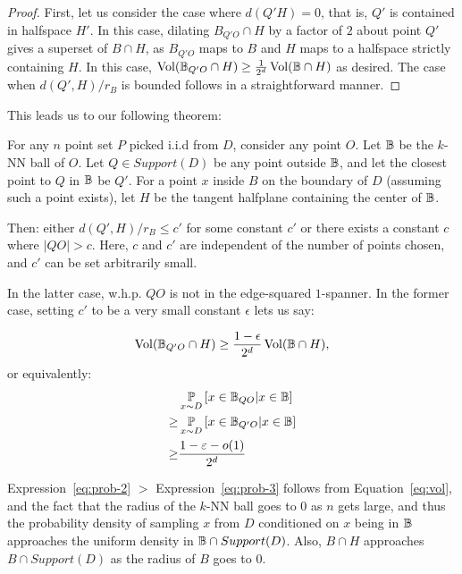 \begin{proof} First, let us consider the case where $d(Q' H) =
0$, that is, $Q'$ is contained in halfspace $H'$.  In this case,
  dilating $B_{Q'O} \cap H$ by a factor of $2$ about point $Q'$
  gives a superset of $B\cap H$, as $B_{Q'O}$ maps to $B$ and $H$
  maps to a halfspace strictly containing $H$. In this case,
  $\operatorname{Vol}(\mathbb{B}_{Q'O} \cap H) \geq \frac{1}{2^d} \operatorname{Vol}(\mathbb{B} \cap H)$ as
  desired.
  The case when
  $d(Q', H)/r_B$ is bounded follows in a straightforward manner.
  \end{proof}


This leads us to our following theorem:
\begin{theorem} For any $n$ point set $P$ picked i.i.d from $D$, consider any
  point $O$. Let $\mathbb{B}$ be the $k$-NN ball of $O$.  
  Let $Q \in Support(D)$ be any point outside 
  $\mathbb{B}$, and let the closest point to $Q$ in $\mathbb{B}$ be $Q'$. For a
  point $x$ inside $B$ on the boundary of $D$ (assuming such a
  point exists), let $H$ be the tangent halfplane containing the
  center of $\mathbb{B}$.

  Then: either $d(Q', H) /
  r_B \leq c'$ for some constant $c'$ or there exists a constant
  $c$ where $|QO| > c$. Here, $c$ and $c'$ are
  independent of the number of points chosen, and $c'$ can be set
  arbitrarily small.

  In the latter case, w.h.p. $QO$ is not in the edge-squared
  $1$-spanner. In the former case, setting $c'$ to be a very
  small constant $\epsilon$ lets us say:

  \begin{align} \label{eq:vol}
    \operatorname{Vol}(\mathbb{B}_{Q'O} \cap H) \geq \frac{1-\epsilon}{2^d} \operatorname{Vol}(\mathbb{B}
    \cap H),
  \end{align}
  or equivalently:
  \begin{align} \label{eq:prob}
    & \operatorname*{\mathbb{P}}_{x\sim D}\left[ x \in \mathbb{B}_{QO} | x \in \mathbb{B} \right]
  \\
    \label{eq:prob-2}
    \geq & \operatorname*{\mathbb{P}}_{x\sim D}\left[ x \in \mathbb{B}_{Q'O} | x \in \mathbb{B} \right]
  \\ \label{eq:prob-3}
    \geq & \frac{1-\varepsilon-o(1)}{2^d}
  \end{align}
\end{theorem}
Expression~\ref{eq:prob-2} $>$ Expression~\ref{eq:prob-3} follows from Equation~\ref{eq:vol}, and
the fact that the radius of the $k$-NN ball goes to $0$ as $n$
gets large, and thus the probability density of sampling $x$ from
$D$ conditioned on $x$ being in $\mathbb{B}$ approaches the uniform 
density in $\mathbb{B} \cap Support(D)$. Also, $B \cap H$ approaches $B \cap Support(D)$ as the
radius of $B$ goes to $0$. 

